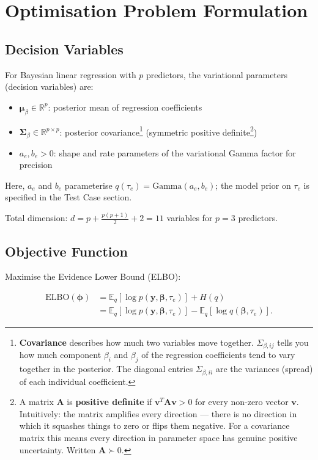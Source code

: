 \documentclass[11pt]{article}
\newcommand{\E}{\mathbb{E}}
\newcommand{\R}{\mathbb{R}}
\newcommand{\ELBO}{\text{ELBO}}
\begin{document}
\section*{Optimisation Problem Formulation}

\subsection*{Decision Variables}

For Bayesian linear regression with $p$ predictors, the variational parameters (decision variables) are:
\begin{itemize}
\item $\bm{\mu}_\beta \in \R^p$: posterior mean of regression coefficients
\item $\bm{\Sigma}_\beta \in \R^{p \times p}$: posterior covariance\footnote{\textbf{Covariance} describes how much two variables move together. $\Sigma_{\beta,ij}$ tells you how much component $\beta_i$ and $\beta_j$ of the regression coefficients tend to vary together in the posterior. The diagonal entries $\Sigma_{\beta,ii}$ are the variances (spread) of each individual coefficient.} (symmetric positive definite\footnote{A matrix $\bm{A}$ is \textbf{positive definite} if $\bm{v}^T\bm{A}\bm{v} > 0$ for every non-zero vector $\bm{v}$. Intuitively: the matrix amplifies every direction --- there is no direction in which it squashes things to zero or flips them negative. For a covariance matrix this means every direction in parameter space has genuine positive uncertainty. Written $\bm{A} \succ 0$.})
\item $a_e, b_e > 0$: shape and rate parameters of the variational Gamma factor for precision
\end{itemize}

Here, $a_e$ and $b_e$ parameterise $q(\tau_e)=\mathrm{Gamma}(a_e,b_e)$; the model prior on $\tau_e$ is specified in the Test Case section.

Total dimension: $d = p + \frac{p(p+1)}{2} + 2 = 11$ variables for $p=3$ predictors.

\subsection*{Objective Function}

Maximise the Evidence Lower Bound (ELBO):

\begin{align}
\ELBO(\bm{\phi})
&= \E_q[\log p(\bm{y}, \bm{\beta}, \tau_e)] + H(q) \\
&= \E_q[\log p(\bm{y}, \bm{\beta}, \tau_e)] - \E_q[\log q(\bm{\beta}, \tau_e)] .
\end{align}
\end{document}

